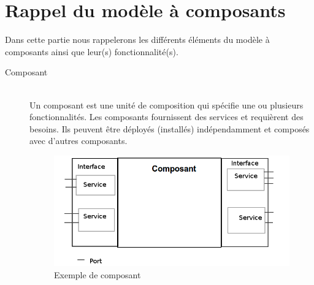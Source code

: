\clearpage

\section{Rappel du modèle à composants}
Dans cette partie nous rappelerons les différents éléments du modèle à composants ainsi que leur(s) fonctionnalité(s).

\begin{description}
\item[Composant] \hfill \\
  Un composant est une unité de composition qui spécifie  une ou plusieurs fonctionnalités. Les composants fournissent des services et requièrent des besoins. Ils peuvent être déployés (installés) indépendamment et composés avec d'autres composants.
  \begin{figure}[htb]
    \centering
    \includegraphics[scale=0.36]{img/composant}
    \caption{Exemple de composant}
    \label{fig:compo}
  \end{figure}
  

\end{description}
